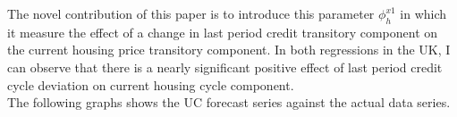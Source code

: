 \documentclass[fleqn]{article}
\begin{document}
\begin{outline}[enumerate]
\begin{landscape}
\begin{table}[]
			\end{table}
			
		\end{landscape}
		
		\clearpage
		
		
		The novel contribution of this paper is to introduce this parameter $\phi^{x1}_h$ in which it measure the effect of a change in last period credit transitory component on the current housing price transitory component. In both regressions in the UK, I can observe that there is a nearly significant positive effect of last period credit cycle deviation on current housing cycle component.
		\\
		
		The following graphs shows the UC forecast series against the actual data series.
		
		
		

\end{outline}
\end{document}
